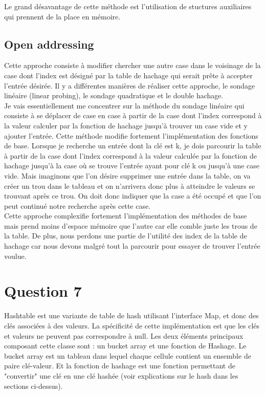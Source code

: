 \documentclass[10pt,a4paper]{article}
\begin{document}
Le grand désavantage de cette méthode est l'utilisation de stuctures auxiliaires qui prennent de la place en mémoire.
 
 \subsection*{Open addressing}
 
 Cette approche consiste à modifier chercher une autre case dans le voisinage de la case dont l'index est désigné par la table de hachage qui serait prête à accepter l'entrée désirée. Il y a différentes manières de réaliser cette approche, le sondage linéaire (linear probing), le sondage quadratique et le double hachage. \\

Je vais essentiellement me concentrer sur la méthode du sondage linéaire qui consiste à se déplacer de case en case à partir de la case dont l'index correspond à la valeur calculer par la fonction de hachage jusqu'à trouver un case vide et y ajouter l'entrée. Cette méthode modifie fortement l'implémentation des fonctions de base. Lorsque je recherche un entrée dont la clé est k, je dois parcourir la table à partir de la case dont l'index correspond à la valeur calculée par la fonction de hachage jusqu'à la case où se trouve l'entrée ayant pour clé k ou jusqu'à une case vide. Mais imaginons que l'on désire supprimer une entrée dans la table, on va créer un trou dans le tableau et on n'arrivera donc plus à atteindre le valeurs se trouvant après ce trou. On doit donc indiquer que la case a été occupé et que l'on peut continué notre recherche après cette case.\\

Cette approche complexifie fortement l'implémentation des méthodes de base mais prend moins d'espace mémoire que l'autre car elle comble juste les trous de la table. De plus, nous perdons une partie de l'utilité des index de la table de hachage car nous devons malgré tout la parcourir pour essayer de trouver l'entrée voulue.\\
\section*{Question 7}

Hashtable est une variante de table de hash utilisant l'interface Map, et donc des clés associées à des valeurs. La spécificité de cette implémentation est que les clés et valeurs ne peuvent pas correspondre à null. Les deux éléments principaux composant cette classe sont : un bucket array et une fonction de Hashage. Le bucket array est un tableau dans lequel chaque cellule contient un ensemble de paire clé-valeur. Et la fonction de hashage est une fonction permettant de "convertir" une clé en une clé hashée (voir explications sur le hash dans les sections ci-dessus).
\\
\end{document}
